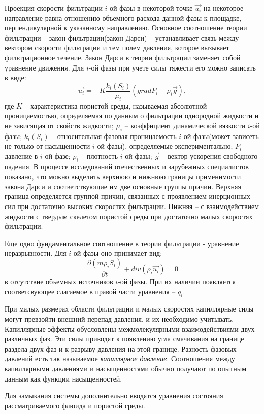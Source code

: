 Проекция скорости фильтрации $i$-ой фазы в некоторой точке
$\overrightarrow{u_i}$ на некоторое направление равна отношению объемного
расхода данной фазы к площадке, перпендикулярной к указанному направлению.
Основное соотношение теории фильтрации -- закон фильтрации(закон Дарси) -- устанавливает 
связь между вектором скорости фильтрации и тем полем давления, которое вызывает 
фильтрационное течение. Закон Дарси в теории фильтрации заменяет собой уравнение 
движения. Для $i$-ой фазы при учете силы тяжести его можно записать в виде:
\begin{equation}
\label{Darcy}
  \overrightarrow{u_i}=-K \frac{k_i(S_i)}{{\mu}_i}(grad P_i - {\rho}_i\overrightarrow{g}),
\end{equation}
где $K$ -- характеристика пористой среды, называемая
абсолютной проницаемостью, определяемая по данным о фильтрации однородной
жидкости и не зависящая от свойств жидкости; $\mu_i$ -- коэффициент динамической
вязкости $i$-ой фазы; $k_i(S_i)$ -- относительная фазовая проницаемость $i$-ой фазы(может зависеть 
не только от насыщенности $i$-ой фазы), определяемые
экспериментально; $P_i$ -- давление в $i$-ой фазе; ${\rho}_i$ -- плотность $i$-ой фазы;
$\overrightarrow{g}$ -- вектор ускорения свободного падения.
В процессе исследований отечественных и зарубежных специалистов показано, что 
можно выделить верхнюю и нижнюю границы применимости закона Дарси и соответствующие 
им две основные группы причин. Верхняя граница определяется группой причин, связанных 
с проявлением инерционных сил при достаточно высоких скоростях фильтрации. Нижняя --
с взаимодействием жидкости с твердым скелетом пористой среды при достаточно малых 
скоростях фильтрации.

Еще одно фундаментальное соотношение в теории фильтрации - уравнение неразрывности. 
Для $i$-ой фазы оно принимает вид:
 \begin{equation}
 \label{mass}
 	 \frac{\partial (m \rho_i S_i)}{\partial t}+ div(\rho_i \overrightarrow{u_i}) = 0 
 \end{equation}
 в отсутствие объемных источников $i$-ой фазы. При их наличии появляется
соответсвующее слагаемое в правой части уравнения -- $q_i$.

При малых размерах области фильтрации и малых скоростях капиллярные силы могут
превзойти внешний перепад давления, и их необходимо учитывать.
Капиллярные эффекты обусловлены межмолекулярными взаимодействиями двух различных
фаз. Эти силы приводят к появлению угла смачивания на границе раздела двух фаз и
к разрыву давления на этой границе. Разность фазовых давлений есть так
называемое \textit{капиллярное давление}. Соотношения между капиллярными
давлениями и насыщенностями обычно получают по опытным данным как функции насыщенностей.

Для замыкания системы дополнительно вводятся уравнения состояния рассматриваемого флюида
и пористой среды.
